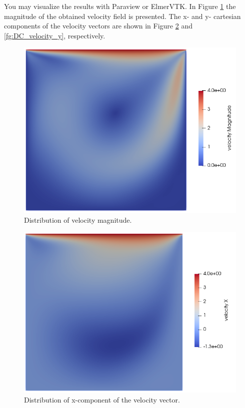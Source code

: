 You may visualize the results with Paraview or ElmerVTK.
In Figure \ref{fg:DC_velocity_magnitude} the magnitude of the obtained velocity field is presented. The x- and y- cartesian components of the velocity vectors are shown in Figure \ref{fg:DC_velocity_x} and \ref{fg:DC_velocity_y}, respectively.

\begin{figure}[H]
\centering
\includegraphics[scale=0.5]{DC_velocity_magnitude}
\caption{Distribution of velocity magnitude.}\label{fg:DC_velocity_magnitude}
\end{figure} 

\begin{figure}[H]
\centering
\includegraphics[scale=0.5]{DC_velocity_x}
\caption{Distribution of x-component of the velocity vector.}\label{fg:DC_velocity_x}
\end{figure} 

